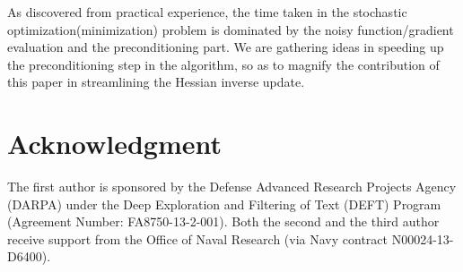 \documentclass[conference]{IEEEtran}
\begin{document}
As discovered from practical experience, the time taken in the
stochastic optimization(minimization) problem is dominated by the
noisy function/gradient evaluation and the preconditioning part. We
are gathering ideas in speeding up the preconditioning step in the
algorithm, so as to magnify the contribution of this paper in
streamlining the Hessian inverse update.

\section*{Acknowledgment} The first author is sponsored by the
Defense Advanced Research Projects Agency (DARPA) under the Deep
Exploration and Filtering of Text (DEFT) Program (Agreement Number:
FA8750-13-2-001). Both the second and the third author receive
support from the Office of Naval Research (via Navy contract
N00024-13-D6400).
\end{document}
